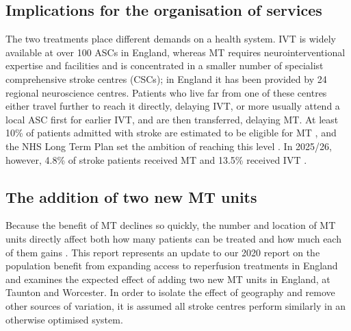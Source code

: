 \subsection{Implications for the organisation of services}

The two treatments place different demands on a health system. IVT is widely available at over 100 ASCs in England, whereas MT requires neurointerventional expertise and facilities and is concentrated in a smaller number of specialist comprehensive stroke centres (CSCs); in England it has been provided by 24 regional neuroscience centres. Patients who live far from one of these centres either travel further to reach it directly, delaying IVT, or more usually attend a local ASC first for earlier IVT, and are then transferred, delaying MT. At least 10\% of patients admitted with stroke are estimated to be eligible for MT \cite{mcmeekin2017}, and the NHS Long Term Plan set the ambition of reaching this level \cite{nhsltp2019}. In 2025/26, however, 4.8\% of stroke patients received MT and 13.5\% received IVT \cite{ssnap2025}.

\subsection{The addition of two new MT units}

Because the benefit of MT declines so quickly, the number and location of MT units directly affect both how many patients can be treated and how much each of them gains \cite{allen2019}. This report represents an update to our 2020 report on the population benefit from expanding access to reperfusion treatments in England \cite{allen2020} and examines the expected effect of adding two new MT units in England, at Taunton and Worcester. In order to isolate the effect of geography and remove other sources of variation, it is assumed all stroke centres perform similarly in an otherwise optimised system.
